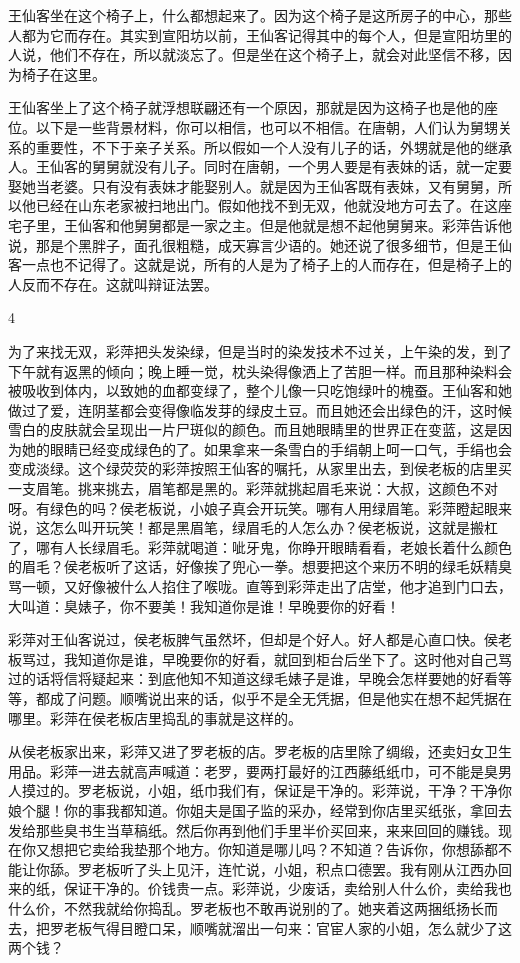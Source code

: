 王仙客坐在这个椅子上，什么都想起来了。因为这个椅子是这所房子的中心，那些人都为它而存在。其实到宣阳坊以前，王仙客记得其中的每个人，但是宣阳坊里的人说，他们不存在，所以就淡忘了。但是坐在这个椅子上，就会对此坚信不移，因为椅子在这里。 

王仙客坐上了这个椅子就浮想联翩还有一个原因，那就是因为这椅子也是他的座位。以下是一些背景材料，你可以相信，也可以不相信。在唐朝，人们认为舅甥关系的重要性，不下于亲子关系。所以假如一个人没有儿子的话，外甥就是他的继承人。王仙客的舅舅就没有儿子。同时在唐朝，一个男人要是有表妹的话，就一定要娶她当老婆。只有没有表妹才能娶别人。就是因为王仙客既有表妹，又有舅舅，所以他已经在山东老家被扫地出门。假如他找不到无双，他就没地方可去了。在这座宅子里，王仙客和他舅舅都是一家之主。但是他就是想不起他舅舅来。彩萍告诉他说，那是个黑胖子，面孔很粗糙，成天寡言少语的。她还说了很多细节，但是王仙客一点也不记得了。这就是说，所有的人是为了椅子上的人而存在，但是椅子上的人反而不存在。这就叫辩证法罢。 

4 

为了来找无双，彩萍把头发染绿，但是当时的染发技术不过关，上午染的发，到了下午就有返黑的倾向；晚上睡一觉，枕头染得像洒上了苦胆一样。而且那种染料会被吸收到体内，以致她的血都变绿了，整个儿像一只吃饱绿叶的槐蚕。王仙客和她做过了爱，连阴茎都会变得像临发芽的绿皮土豆。而且她还会出绿色的汗，这时候雪白的皮肤就会呈现出一片尸斑似的颜色。而且她眼睛里的世界正在变蓝，这是因为她的眼睛已经变成绿色的了。如果拿来一条雪白的手绢朝上呵一口气，手绢也会变成淡绿。这个绿荧荧的彩萍按照王仙客的嘱托，从家里出去，到侯老板的店里买一支眉笔。挑来挑去，眉笔都是黑的。彩萍就挑起眉毛来说：大叔，这颜色不对呀。有绿色的吗？侯老板说，小娘子真会开玩笑。哪有人用绿眉笔。彩萍瞪起眼来说，这怎么叫开玩笑！都是黑眉笔，绿眉毛的人怎么办？侯老板说，这就是搬杠了，哪有人长绿眉毛。彩萍就喝道：呲牙鬼，你睁开眼睛看看，老娘长着什么颜色的眉毛？侯老板听了这话，好像挨了兜心一拳。想要把这个来历不明的绿毛妖精臭骂一顿，又好像被什么人掐住了喉咙。直等到彩萍走出了店堂，他才追到门口去，大叫道：臭婊子，你不要美！我知道你是谁！早晚要你的好看！ 

彩萍对王仙客说过，侯老板脾气虽然坏，但却是个好人。好人都是心直口快。侯老板骂过，我知道你是谁，早晚要你的好看，就回到柜台后坐下了。这时他对自己骂过的话将信将疑起来：到底他知不知道这绿毛婊子是谁，早晚会怎样要她的好看等等，都成了问题。顺嘴说出来的话，似乎不是全无凭据，但是他实在想不起凭据在哪里。彩萍在侯老板店里捣乱的事就是这样的。 

从侯老板家出来，彩萍又进了罗老板的店。罗老板的店里除了绸缎，还卖妇女卫生用品。彩萍一进去就高声喊道：老罗，要两打最好的江西藤纸纸巾，可不能是臭男人摸过的。罗老板说，小姐，纸巾我们有，保证是干净的。彩萍说，干净？干净你娘个腿！你的事我都知道。你姐夫是国子监的采办，经常到你店里买纸张，拿回去发给那些臭书生当草稿纸。然后你再到他们手里半价买回来，来来回回的赚钱。现在你又想把它卖给我垫那个地方。你知道是哪儿吗？不知道？告诉你，你想舔都不能让你舔。罗老板听了头上见汗，连忙说，小姐，积点口德罢。我有刚从江西办回来的纸，保证干净的。价钱贵一点。彩萍说，少废话，卖给别人什么价，卖给我也什么价，不然我就给你捣乱。罗老板也不敢再说别的了。她夹着这两捆纸扬长而去，把罗老板气得目瞪口呆，顺嘴就溜出一句来：官宦人家的小姐，怎么就少了这两个钱？ 

